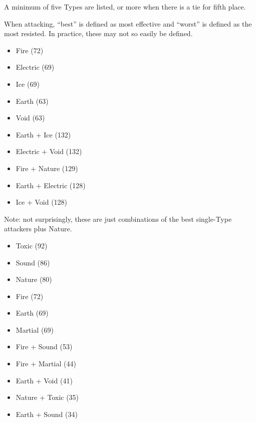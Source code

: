 A minimum of five Types are listed, or more when there is a tie for fifth place.


When attacking, ``best'' is defined as most effective and ``worst'' is defined as the most resisted. In practice, these may not so easily be defined.




\begin{itemize}
	\item{Fire (72)}
	\item{Electric (69)}
	\item{Ice (69)}
	\item{Earth (63)}
	\item{Void (63)}
\end{itemize}


\begin{itemize}
	\item{Earth + Ice (132)}
	\item{Electric + Void (132)}
	\item{Fire + Nature (129)}
	\item{Earth + Electric (128)}
	\item{Ice + Void (128)}
\end{itemize}

\noindent Note: not surprisingly, these are just combinations of the best single-Type attackers plus Nature.


\begin{itemize}
	\item{Toxic (92)}
	\item{Sound (86)}
	\item{Nature (80)}
	\item{Fire (72)}
	\item{Earth (69)}
	\item{Martial (69)}
\end{itemize}

\begin{itemize}
	\item{Fire + Sound (53)}
	\item{Fire + Martial (44)}
	\item{Earth + Void (41)}
	\item{Nature + Toxic (35)}
	\item{Earth + Sound (34)}
\end{itemize}

